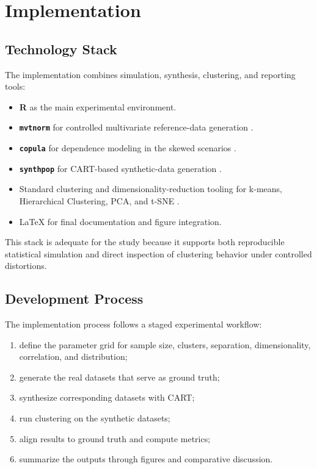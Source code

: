 \chapter{Implementation}
\label{chap:implementation}

\section{Technology Stack}
\label{sec:technology-stack}

The implementation combines simulation, synthesis, clustering, and reporting tools:
\begin{itemize}
  \item \textbf{R} as the main experimental environment.
  \item \textbf{\texttt{mvtnorm}} for controlled multivariate reference-data generation \cite{mvtnormmanual,genzbretz2009}.
  \item \textbf{\texttt{copula}} for dependence modeling in the skewed scenarios \cite{yan2007}.
  \item \textbf{\texttt{synthpop}} for CART-based synthetic-data generation \cite{nowok2016}.
  \item Standard clustering and dimensionality-reduction tooling for k-means, Hierarchical Clustering, PCA, and t-SNE \cite{jolliffe2002,vandermaaten2008}.
  \item \LaTeX{} for final documentation and figure integration.
\end{itemize}

This stack is adequate for the study because it supports both reproducible statistical simulation and direct inspection of clustering behavior under controlled distortions.

\section{Development Process}
\label{sec:development-process}

The implementation process follows a staged experimental workflow:
\begin{enumerate}
  \item define the parameter grid for sample size, clusters, separation, dimensionality, correlation, and distribution;
  \item generate the real datasets that serve as ground truth;
  \item synthesize corresponding datasets with CART;
  \item run clustering on the synthetic datasets;
  \item align results to ground truth and compute metrics;
  \item summarize the outputs through figures and comparative discussion.
\end{enumerate}

